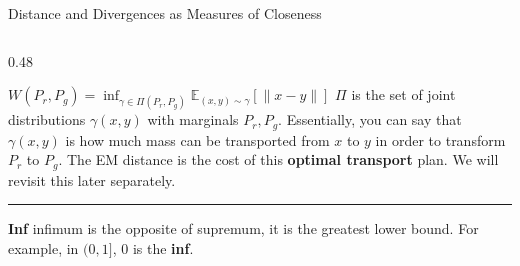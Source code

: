\documentclass[aspectratio=169,xcolor=dvipsnames,svgnames,x11names,fleqn]{beamer}
\begin{document}
\begin{frame}{Distance and Divergences as Measures of Closeness}
\begin{columns}[T]
\begin{column}{0.48\textwidth}
            \begin{tcolorbox}[enhanced, colback=WGANOrange!5, colframe=WGANOrange, title=\small Wasserstein (EM Distance), fonttitle=\bfseries, boxrule=0.8pt]
                \scriptsize
                $W(P_r, P_g) = \inf_{\gamma \in \Pi(P_r, P_g) } \mathbb{E}_{(x, y) \sim \gamma} [ \| x - y\|]$
                \vspace{0.1cm}
                $\Pi$ is the set of joint distributions $\gamma(x,y)$ with marginals $P_r, P_g$. Essentially, you can say that $\gamma(x,y)$ is how much mass can be transported from $x$ to $y$ in order to transform $P_r$ to $P_g$. The EM distance is the cost of this \textbf{optimal transport} plan. We will revisit this later separately.
                \hrule
                \vspace{0.1cm}
                
                \textbf{Inf} infimum is the opposite of supremum, it is the greatest lower bound. For example, in $(0, 1]$, $0$ is the \textbf{inf}.
            \end{tcolorbox}
        \end{column}
    \end{columns}

   
\end{frame}
\end{document}
